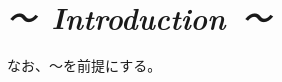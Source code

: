 \documentclass[10pt,a4j,openany,dvipdfmx]{jsbook}
\begin{document}
\chapter*{\it {～\ Introduction\ ～}}




なお、〜を前提にする。


\end{document}
